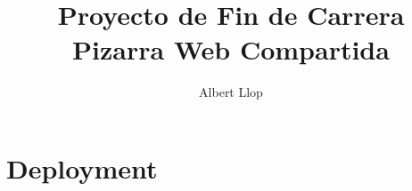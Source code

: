 \documentclass [11pt]{report}
\begin{document}
\author{Albert Llop}
\title{\Huge{\textbf{Proyecto de Fin de Carrera} \\ Pizarra Web Compartida}}
\maketitle
\newpage
\tableofcontents
\chapter{Deployment}

\newpage

\end{document}
